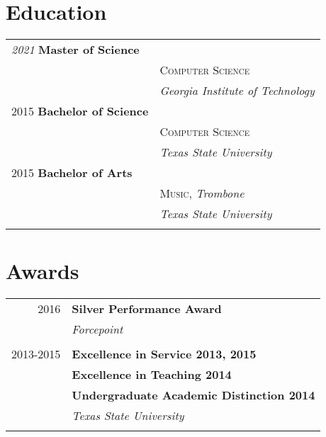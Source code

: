 \documentclass[10pt]{article} %
\begin{document}
\begin{minipage}[t]{0.44\textwidth}
\section{Education} 

\begin{tabular}{ll} %

\textit{2021} \textbf{Master of Science}\\
& \textsc{Computer Science}\\
& \textit{Georgia Institute of Technology}\\

2015 \textbf{Bachelor of Science} \\ 
& \textsc{Computer Science} \\ 
& \textit{Texas State University}\\

	 

2015 \textbf{Bachelor of Arts} \\ 
& \textsc{Music}, \textit{Trombone}\\ 
& \textit{Texas State University}\\ \\

\end{tabular}




\section{Awards} 

\begin{tabular}{rl}
2016     & \textbf{Silver Performance Award}\\
& \textit{Forcepoint}\\ \\

2013-2015     & \textbf{Excellence in Service 2013, 2015}\\
& \textbf{Excellence in Teaching 2014}\\
& \textbf{Undergraduate Academic Distinction 2014}\\
& \textit{Texas State University}\\\\


\end{tabular}
\end{minipage}
\end{document}
